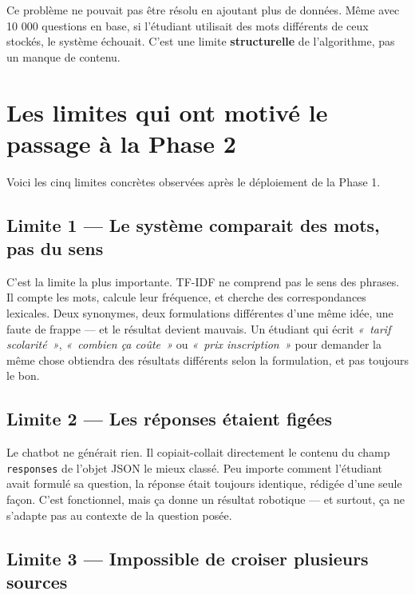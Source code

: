 \documentclass[11pt,a4paper]{article}
\begin{document}
Ce problème ne pouvait pas être résolu en ajoutant plus de données.
Même avec 10 000 questions en base, si l'étudiant utilisait des
mots différents de ceux stockés, le système échouait. C'est une
limite \textbf{structurelle} de l'algorithme, pas un manque de contenu.

\clearpage

\section{Les limites qui ont motivé le passage à la Phase 2}

Voici les cinq limites concrètes observées après le déploiement
de la Phase 1.

\subsection{Limite 1 --- Le système comparait des mots, pas du sens}

C'est la limite la plus importante. TF-IDF ne comprend pas le sens
des phrases. Il compte les mots, calcule leur fréquence, et cherche
des correspondances lexicales. Deux synonymes, deux formulations
différentes d'une même idée, une faute de frappe --- et le résultat
devient mauvais. Un étudiant qui écrit \textit{«~tarif scolarité~»},
\textit{«~combien ça coûte~»} ou \textit{«~prix inscription~»} pour
demander la même chose obtiendra des résultats différents selon
la formulation, et pas toujours le bon.

\subsection{Limite 2 --- Les réponses étaient figées}

Le chatbot ne générait rien. Il copiait-collait directement le
contenu du champ \texttt{responses} de l'objet JSON le mieux
classé. Peu importe comment l'étudiant avait formulé sa question,
la réponse était toujours identique, rédigée d'une seule façon.
C'est fonctionnel, mais ça donne un résultat robotique --- et
surtout, ça ne s'adapte pas au contexte de la question posée.

\subsection{Limite 3 --- Impossible de croiser plusieurs sources}
\end{document}
